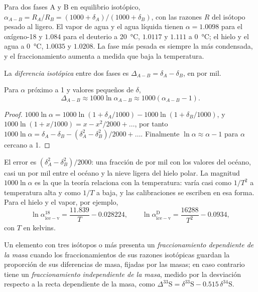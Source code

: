 Para dos fases A y B en equilibrio isotópico, $\alpha_{A-B} = R_A/R_B =
(1000 + \delta_A)/(1000 + \delta_B)$, con las razones $R$ del isótopo pesado al
ligero. El vapor de agua y el agua líquida tienen $\alpha = 1.0098$ para el oxígeno-18
y $1.084$ para el deuterio a \qty{20}{\celsius}, $1.0117$ y $1.111$ a
\qty{0}{\celsius}; el hielo y el agua a \qty{0}{\celsius}, $1.0035$ y $1.0208$.
La fase más pesada es siempre la más condensada, y el fraccionamiento
aumenta a medida que baja la temperatura.

\begin{definition}\label{def:b3:stable-isotopes:big-delta}
La \emph{diferencia isotópica}
entre dos fases es $\Delta_{A-B} = \delta_A - \delta_B$, en por mil.
\end{definition}

\begin{proposition}
\label{prop:b3:stable-isotopes:big-delta}
Para $\alpha$ próximo a 1 y valores pequeños de $\delta$,
\[
\Delta_{A-B} \approx 1000\ln\alpha_{A-B} \approx 1000(\alpha_{A-B} - 1).
\]
\end{proposition}

\begin{proof}
$1000\ln\alpha = 1000\ln(1 + \delta_A/1000) - 1000\ln(1 + \delta_B/1000)$, y
$1000\ln(1 + x/1000) = x - x^2/2000 + \dots$, por tanto $1000\ln\alpha = \delta_A -
\delta_B - (\delta_A^2 - \delta_B^2)/2000 + \dots$. Finalmente $\ln\alpha \approx
\alpha - 1$ para $\alpha$ cercano a 1.
\end{proof}

El error es $(\delta_A^2 - \delta_B^2)/2000$: una fracción de por mil con los
valores del océano, casi un por mil entre el océano y la nieve ligera del
hielo polar.
La magnitud $1000\ln\alpha$ es la que la teoría relaciona con la temperatura: varía
casi como $1/T^2$ a temperatura alta y como $1/T$ a baja,
y las calibraciones se escriben en esa forma. Para el hielo y el vapor, por ejemplo,
\[
\ln\alpha^{18}_{\mathrm{ice-v}} = \frac{11.839}{T} - 0.028224, \qquad
\ln\alpha^{\mathrm D}_{\mathrm{ice-v}} = \frac{16288}{T^2} - 0.0934,
\]
con $T$ en kelvins.

\begin{definition}\label{def:b3:stable-isotopes:mif}
Un elemento con tres isótopos o más presenta un \emph{fraccionamiento dependiente
de la masa} cuando los fraccionamientos de
sus razones isotópicas guardan la proporción de sus diferencias de masa, fijadas por las
masas; en caso contrario tiene un \emph{fraccionamiento independiente
de la masa}, medido por la desviación
respecto a la recta dependiente de la masa, como $\Delta^{33}\mathrm S = \delta^{33}\mathrm S
- 0.515\,\delta^{34}\mathrm S$.
\end{definition}

